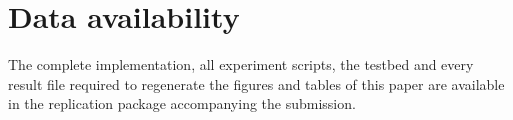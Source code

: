 \documentclass[preprint,11pt,3p]{elsarticle}
\theoremstyle{plain}
\theoremstyle{definition}
\begin{document}
\FloatBarrier
\section*{Data availability}
The complete implementation, all experiment scripts, the testbed and every result file
required to regenerate the figures and tables of this paper are available in the
replication package accompanying the submission.



\end{document}
